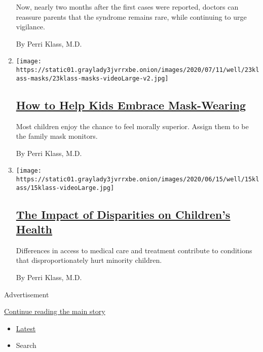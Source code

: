 \begin{enumerate}
  Now, nearly two months after the first cases were reported, doctors
  can reassure parents that the syndrome remains rare, while continuing
  to urge vigilance.

  By Perri Klass, M.D.
\item
  \texttt{[image: https://static01.graylady3jvrrxbe.onion/images/2020/07/11/well/23klass-masks/23klass-masks-videoLarge-v2.jpg]}

  \hypertarget{how-to-help-kids-embrace-mask-wearing}{%
  \subsection{\texorpdfstring{\href{/2020/06/23/well/family/children-masks-coronavirus.html}{How
  to Help Kids Embrace
  Mask-Wearing}}{How to Help Kids Embrace Mask-Wearing}}\label{how-to-help-kids-embrace-mask-wearing}}

  Most children enjoy the chance to feel morally superior. Assign them
  to be the family mask monitors.

  By Perri Klass, M.D.
\item
  \texttt{[image: https://static01.graylady3jvrrxbe.onion/images/2020/06/15/well/15klass/15klass-videoLarge.jpg]}

  \hypertarget{the-impact-of-disparities-on-childrens-health}{%
  \subsection{\texorpdfstring{\href{/2020/06/15/well/family/the-impact-of-disparities-on-childrens-health.html}{The
  Impact of Disparities on Children's
  Health}}{The Impact of Disparities on Children's Health}}\label{the-impact-of-disparities-on-childrens-health}}

  Differences in access to medical care and treatment contribute to
  conditions that disproportionately hurt minority children.

  By Perri Klass, M.D.
\end{enumerate}

Advertisement

\protect\hyperlink{after-mid2}{Continue reading the main story}

\begin{itemize}
\tightlist
\item
  \protect\hyperlink{stream-panel}{Latest}
\item
  Search
\end{itemize}

